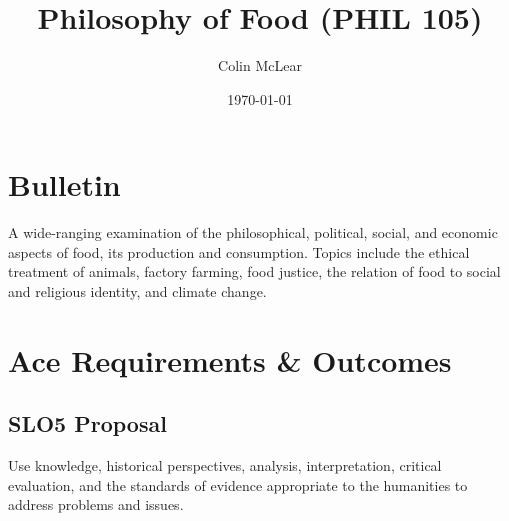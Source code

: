 \documentclass[11pt]{article}
\author{Colin McLear}
\date{\today}
\title{Philosophy of Food (PHIL 105)}
\begin{document}
\maketitle

\section*{Bulletin}
\label{sec-1}
A wide-ranging examination of the philosophical, political, social, and economic
aspects of food, its production and consumption. Topics include the ethical
treatment of animals, factory farming, food justice, the relation of food to
social and religious identity, and climate change.

\section*{Ace Requirements \& Outcomes}
\label{sec-2}
\subsection*{SLO5 Proposal}
\label{sec-2-1}
Use knowledge, historical perspectives, analysis, interpretation, critical
evaluation, and the standards of evidence appropriate to the humanities to
address problems and issues.
\end{document}

